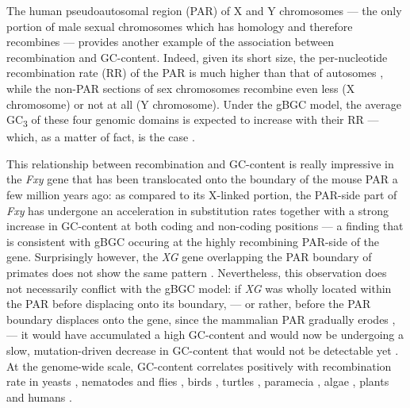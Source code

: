 The human pseudoautosomal region (PAR) of X and Y chromosomes — the only portion of male sexual chromosomes which has homology and therefore recombines — provides another example of the association between recombination and GC-content.
Indeed, given its short size, the per-nucleotide recombination rate (RR) of the PAR is much higher than that of autosomes \citep{soriano1987high}, while the non-PAR sections of sex chromosomes recombine even less (X chromosome) or not at all (Y chromosome).
Under the gBGC model, the average GC\textsubscript{3} of these four genomic domains is expected to increase with their RR — which, as a matter of fact, is the case \citep{galtier2001gccontent}.

This relationship between recombination and GC-content is really impressive in the \textit{Fxy} gene that has been translocated onto the boundary of the mouse PAR a few million years ago: as compared to its X-linked portion, the PAR-side part of \textit{Fxy} has undergone an acceleration in substitution rates \citep{perry1999evolutionary} together with a strong increase in GC-content at both coding and non-coding positions \citep{montoya-burgos2003recombination,galtier2007adaptation} — a finding that is consistent with gBGC occuring at the highly recombining PAR-side of the gene.
Surprisingly however, the \textit{XG} gene overlapping the PAR boundary of primates does not show the same pattern \citep{yi2004recombination}.
Nevertheless, this observation does not necessarily conflict with the gBGC model: if \textit{XG} was wholly located within the PAR before displacing onto its boundary, — or rather, before the PAR boundary displaces onto the gene, since the mammalian PAR gradually erodes \citep{lahn1999four,marais2003sex}, — it would have accumulated a high GC-content and would now be undergoing a slow, mutation-driven decrease in GC-content that would not be detectable yet \citep{galtier2004recombination}.\\


At the genome-wide scale, GC-content correlates positively with recombination rate in yeasts \citep{gerton2000global,birdsell2002integrating}, nematodes and flies \citep{marais2001does,marais2003neutral,marais2002hillrobertson}, birds \citep{internationalchickengenomesequencingconsortium2004sequence}, turtles \citep{kuraku2006cdnabased}, paramecia \citep{duret2008analysis}, algae \citep{jancek2008clues}, plants \citep{glemin2006impact} and humans \citep{fullerton2001local,yu2001comparison,meunier2004recombination,khelifi2006gc,duret2008impact}.

